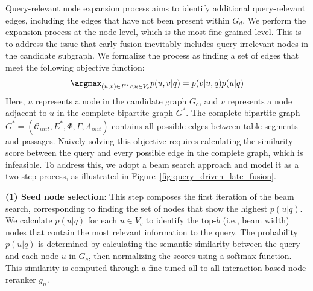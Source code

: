 Query-relevant node expansion process aims to identify additional query-relevant edges, including the edges that have not been present within $G_d$. 
We perform the expansion process at the node level, which is the most fine-grained level. 
This is to address the issue that early fusion inevitably includes query-irrelevant nodes in the candidate subgraph.
We formalize the process as finding a set of edges that meet the following objective function:
\vspace{-3mm}
\begin{equation}
    \argmax_{(u,v)\in E^*\wedge u \in V_c} p(u,v|q) =  p(v|u,q)p(u|q)
    \vspace{-2mm}
\label{eqn:query_driven_late_fusion_objective}
\end{equation}
Here, $u$ represents a node in the candidate graph $G_c$, and $v$ represents a node adjacent to $u$ in the complete bipartite graph $G^*$. 
The complete bipartite graph $G^* = (\mathcal{C}_{init}, E^*, \Phi, \Gamma, \Lambda_{init})$ contains all possible edges between table segments and passages. 
Naively solving this objective requires calculating the similarity score between the query and every possible edge in the complete graph, which is infeasible. 
To address this, we adopt a beam search approach and model it as a two-step process, as illustrated in Figure~\ref{fig:query_driven_late_fusion}.



\textbf{(1) Seed node selection}: 
This step composes the first iteration of the beam search, corresponding to finding the set of nodes that show the highest $p(u|q)$.
We calculate $p(u|q)$ for each $u \in V_c$ to identify the top-$b$ (i.e., beam width) nodes that contain the most relevant information to the query.
The probability $p(u|q)$ is determined by calculating the semantic similarity between the query and each node $u$ in $G_c$, then normalizing the scores using a softmax function. 
This similarity is computed through a fine-tuned all-to-all interaction-based node reranker $g_{n}$.
 

